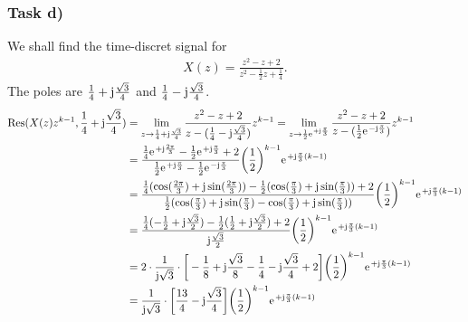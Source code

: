 \subsubsection{Task d)}
We shall find the time-discret signal for
\begin{align}
	X(z)=\frac{z^2-z+2}{z^2-\frac{1}{2}z+\frac{1}{4}}.
\end{align}
The poles are $\frac{1}{4}+\im\frac{\sqrt{3}}{4}$ and $\frac{1}{4}-\im\frac{\sqrt{3}}{4}$.
\begin{align}
	\mathrm{Res}(X(z)z^{k-1},\frac{1}{4}+\im\frac{\sqrt{3}}{4})&=\lim\limits_{z\rightarrow\frac{1}{4}+\im\frac{\sqrt{3}}{4}}\frac{z^2-z+2}{z-(\frac{1}{4}-\im\frac{\sqrt{3}}{4})}z^{k-1}=\lim\limits_{z\rightarrow\frac{1}{2}\e^{+\im\frac{\pi}{3}}}\frac{z^2-z+2}{z-(\frac{1}{2}\e^{-\im\frac{\pi}{3}})}z^{k-1}\nonumber\\
	&=\frac{\frac{1}{4}\e^{+\im\frac{2\pi}{3}}-\frac{1}{2}\e^{+\im\frac{\pi}{3}}+2}{\frac{1}{2}\e^{+\im\frac{\pi}{3}}-\frac{1}{2}\e^{-\im\frac{\pi}{3}}}\bigg(\frac{1}{2}\bigg )^{k-1}\e^{+\im\frac{\pi}{3}(k-1)}\nonumber\\
	&=\frac{\frac{1}{4}(\cos(\frac{2\pi}{3})+\im\sin(\frac{2\pi}{3}))-\frac{1}{2}(\cos(\frac{\pi}{3})+\im\sin(\frac{\pi}{3}))+2}{\frac{1}{2}(\cos(\frac{\pi}{3})+\im\sin(\frac{\pi}{3})-\cos(\frac{\pi}{3})+\im\sin(\frac{\pi}{3}))}\bigg(\frac{1}{2}\bigg )^{k-1}\e^{+\im\frac{\pi}{3}(k-1)}\nonumber\\
	&=\frac{\frac{1}{4}(-\frac{1}{2}+\im\frac{\sqrt{3}}{2})-\frac{1}{2}(\frac{1}{2}+\im\frac{\sqrt{3}}{2})+2}{\im\frac{\sqrt{3}}{2}}\bigg(\frac{1}{2}\bigg )^{k-1}\e^{+\im\frac{\pi}{3}(k-1)}\nonumber\\
	&=2\cdot\frac{1}{\im\sqrt{3}}\cdot\bigg [-\frac{1}{8}+\im\frac{\sqrt{3}}{8}-\frac{1}{4}-\im\frac{\sqrt{3}}{4}+2\bigg]\bigg(\frac{1}{2}\bigg )^{k-1}\e^{+\im\frac{\pi}{3}(k-1)}\nonumber\\
	&=\frac{1}{\im\sqrt{3}}\cdot\bigg [\frac{13}{4}-\im\frac{\sqrt{3}}{4}\bigg]\bigg(\frac{1}{2}\bigg)^{k-1}\e^{+\im\frac{\pi}{3}(k-1)}
\end{align}
